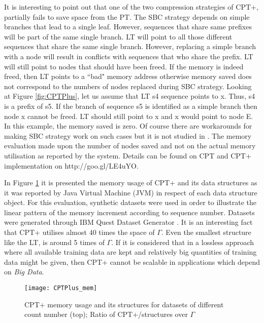 \par It is interesting to point out that one of the two compression strategies of CPT+, partially fails to save space from the PT. The SBC strategy depends on simple branches that lead to a single leaf. However, sequences that share same prefixes will be part of the same single branch. LT will point to all those different sequences that share the same single branch. However, replacing a simple branch with a node will result in conflicts with sequences that who share the prefix. LT will still point to nodes that should have been freed. If the memory is indeed freed, then LT points to a ``bad" memory address otherwise memory saved does not correspond to the numbers of nodes replaced during SBC strategy. Looking at Figure \ref{fig:CPTPlus}, let us assume that LT s4 sequence points to x. Thus, s4 is a prefix of s5. If the branch of sequence s5 is identified as a simple branch then node x cannot be freed. LT should still point to x and x would point to node E. In this example, the memory saved is zero. Of course there are workarounds for making SBC strategy work on such cases but it is not studied in . The memory evaluation made upon the number of nodes saved and not on the actual memory utilisation as reported by the system. Details can be found on CPT and CPT+ implementation on http://goo.gl/LE4uYO.
\par In Figure \ref{fig:CPT_mem} it is presented the memory usage of CPT+ and its data structures as it was reported by Java Virtual Machine (JVM) in respect of each data structure object. For this evaluation, synthetic datasets were used in order to illustrate the linear pattern of the memory increment according to sequence number. Datasets were generated through IBM Quest Dataset Generator \cite{spmf}. It is an interesting fact that CPT+ utilises almost 40 times the space of \(\Gamma\). Even the smallest structure like the LT, is around 5 times of \(\Gamma\). If it is considered that in a lossless approach where all available training data are kept and relatively big quantities of training data might be given, then CPT+ cannot be scalable in applications which depend on \emph{Big Data}.

\begin{figure}[h]
    \centering
    \texttt{[image: CPTPlus\_mem]}
    \caption{CPT+ memory usage and its structures for datasets of different count number (top); Ratio of CPT+/structures over \(\Gamma\)}
    \label{fig:CPT_mem}
\end{figure}

